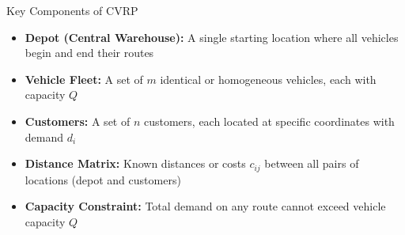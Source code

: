 \documentclass{beamer}
\begin{document}
\begin{frame}{Key Components of CVRP}

\begin{itemize}
\item \textbf{Depot (Central Warehouse):} A single starting location where all vehicles begin and end their routes

\vspace{0.3cm}

\item \textbf{Vehicle Fleet:} A set of $m$ identical or homogeneous vehicles, each with capacity $Q$

\vspace{0.3cm}

\item \textbf{Customers:} A set of $n$ customers, each located at specific coordinates with demand $d_i$

\vspace{0.3cm}

\item \textbf{Distance Matrix:} Known distances or costs $c_{ij}$ between all pairs of locations (depot and customers)

\vspace{0.3cm}

\item \textbf{Capacity Constraint:} Total demand on any route cannot exceed vehicle capacity $Q$
\end{itemize}

\end{frame}
\end{document}
